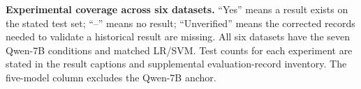 \begin{importtable}
\centering
\caption{\textbf{Experimental coverage across six datasets.} ``Yes'' means a result exists on the stated test set; ``--'' means no result; ``Unverified'' means the corrected records needed to validate a historical result are missing. All six datasets have the seven Qwen-7B conditions and matched LR/SVM. Test counts for each experiment are stated in the result captions and supplemental evaluation-record inventory. The five-model column excludes the Qwen-7B anchor.}
\label{supp:tab:coverage_matrix}
\small
\setlength{\tabcolsep}{4pt}
\end{importtable}
